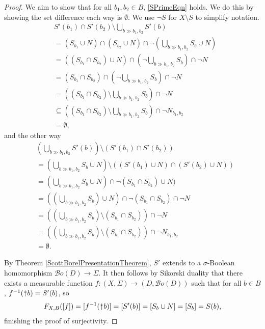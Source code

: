 \documentclass{lmcs}
\newcommand{\uu}{\rotatebox[origin=c]{90}{$\twoheadrightarrow$}}
\newcommand{\Bo}{\ensuremath{\mathcal{B}o}} %
\newcommand{\bnot}{\lnot} %
\begin{document}
\begin{proof}
We aim to show that for all $b_1,b_2 \in B$, \eqref{SPrimeEqn} holds. We do this by showing the set difference each way is $\emptyset$. We use $\bnot S$ for $X \setminus S$ to simplify notation. 
\begin{align*}
& S'(b_1) \cap S'(b_2) \setminus \bigcup_{b \gg b_1,b_2} S'(b) \\
 &= (S_{b_1} \cup N) \cap (S_{b_2} \cup N) \cap \bnot \left(\bigcup_{b \gg b_1,b_2} S_b \cup N\right) \\
 &= ((S_{b_1} \cap S_{b_2}) \cup N) \cap \left(\bnot\bigcup_{b \gg b_1,b_2}S_b\right) \cap \bnot N \\
 &= (S_{b_1} \cap S_{b_2}) \cap \left(\bnot\bigcup_{b \gg b_1,b_2} S_b\right) \cap \bnot N \\
 &= \left((S_{b_1} \cap S_{b_2}) \setminus \bigcup_{b \gg b_1,b_2} S_b\right) \cap \bnot N \\
 &\subseteq \left((S_{b_1} \cap S_{b_2}) \setminus \bigcup_{b \gg b_1,b_2} S_b\right) \cap \bnot N_{b_1,b_2} \\
 &= \emptyset,
\end{align*}
and the other way
\begin{align*}
& \left(\bigcup_{b \gg b_1,b_2}S'(b)\right)\setminus (S'(b_1) \cap S'(b_2)) \\
 &= \left(\bigcup_{b \gg b_1,b_2} S_b \cup N \right) \setminus ((S'(b_1) \cup N) \cap (S'(b_2) \cup N)) \\
 &= \left(\bigcup_{b \gg b_1,b_2} S_b \cup N \right) \cap \bnot (S_{b_1} \cap S_{b_2}) \cup N) \\
 &= \left(\left(\bigcup_{b \gg b_1,b_2} S_b\right) \cup N\right) \cap \bnot (S_{b_1} \cap S_{b_2}) \cap \bnot N \\
 &= \left(\left(\bigcup_{b \gg b_1,b_2} S_b\right) \setminus (S_{b_1} \cap S_{b_2})\right) \cap \bnot N \\
 &= \left(\left(\bigcup_{b \gg b_1,b_2} S_b\right) \setminus (S_{b_1} \cap S_{b_2})\right) \cap \bnot N_{b_1,b_2} \\
 &= \emptyset.
\end{align*}

By Theorem \ref{ScottBorelPresentationTheorem}, $S'$ extends to a $\sigma$-Boolean homomorphism $\Bo(D) \rightarrow \Sigma$. It then follows by Sikorski duality \cite[Proposition 9 (ii)]{unresStoneProc} that there exists a measurable function $f : (X,\Sigma) \rightarrow (D,\Bo(D))$ such that for all $b \in B$, $f^{-1}(\uu b) = S'(b)$, so 
\[
F_{X,B}([f]) = [f^{-1}(\uu b)] = [S'(b)] = [S_b \cup N] = [S_b] = S(b),
\]
finishing the proof of surjectivity. 
\end{proof}
\end{document}
